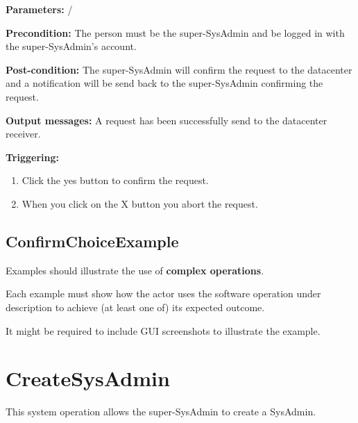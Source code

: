 \begin{description}

\item \textbf{Parameters:} /
\item \textbf{Precondition:} The person must be the super-SysAdmin and be logged
in with the super-SysAdmin's account.
\item \textbf{Post-condition:} The super-SysAdmin will confirm the request to
the datacenter and a notification will be send back to the super-SysAdmin
confirming the request.
\item \textbf{Output messages:} A request has been successfully send to the
datacenter receiver.
\item \textbf{Triggering:} 
\begin{enumerate}
\item Click the yes button to confirm the request.
\item When you click on the X button you abort the request.
\end{enumerate}

 
\end{description}

\subsection{ConfirmChoiceExample}
Examples should illustrate the use of \textbf{complex operations}.

Each example must show how the actor uses the software operation under
description to achieve (at least one of) its expected outcome.

It might be required to include GUI screenshots to illustrate the example.




\section{CreateSysAdmin}
\label{operation:createSysAdmin}
This system operation allows the super-SysAdmin to create a SysAdmin.

